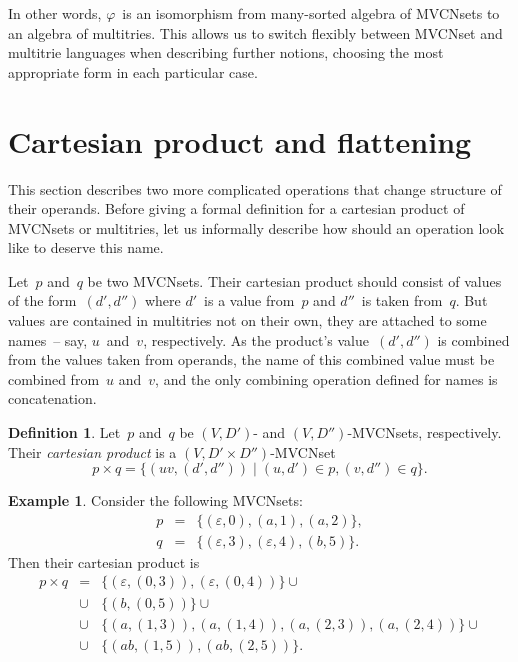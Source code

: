 \documentclass{article}
\theoremstyle{definition}
\newtheorem{Df}{Definition}
\newtheorem{Ex}{Example}
\begin{document}
In other words, $\varphi$~is an isomorphism from many-sorted algebra of
MVCNsets to an algebra of multitries.
This allows us to switch flexibly between MVCNset and multitrie
languages when describing further notions, choosing the most
appropriate form in each particular case.



\section{Cartesian product and flattening}

This section describes two more complicated operations that change structure of
their operands. Before giving a formal definition for a cartesian product of
MVCNsets or multitries, let us informally describe how should an operation
look like to deserve this name.

Let~$p$ and~$q$ be two MVCNsets. Their cartesian product should consist of
values of the form~$(d',d'')$ where $d'$~is a value from~$p$ and $d''$~is taken
from~$q$. But values are contained in multitries not on their own, they are
attached to some names~-- say, $u$~and~$v$, respectively. As the product's
value~$(d',d'')$ is combined from the values taken from operands, the name of
this combined value must be combined from~$u$ and~$v$, and the only combining
operation defined for names is concatenation.

\begin{Df}\label{df:mvcn-cartesian}
Let~$p$ and~$q$ be $(V,D')$- and $(V,D'')$-MVCNsets, respectively. Their
\emph{cartesian product} is a $(V,D'\times D'')$-MVCNset
\[
  p\times q = \{ (uv, (d',d'')) \mid (u,d')\in p, (v,d'')\in q \} .
\]
\end{Df}

\begin{Ex}\label{ex:cartesian}
Consider the following MVCNsets:
\begin{eqnarray*}
  p & = & \{ (\varepsilon, 0), (a, 1), (a, 2) \} , \\
  q & = & \{ (\varepsilon, 3), (\varepsilon, 4), (b, 5) \} .
\end{eqnarray*}
Then their cartesian product is
\begin{eqnarray*}
  p \times q & = &  \{ (\varepsilon, (0, 3)), (\varepsilon, (0, 4)) \} \cup \\
    & \cup & \{ (b, (0, 5)) \} \cup \\
    & \cup & \{ (a, (1, 3)), (a, (1, 4)), (a, (2, 3)), (a, (2, 4)) \} \cup \\
    & \cup & \{ (ab, (1, 5)), (ab, (2, 5)) \} .
\end{eqnarray*}
\end{Ex}
\end{document}
